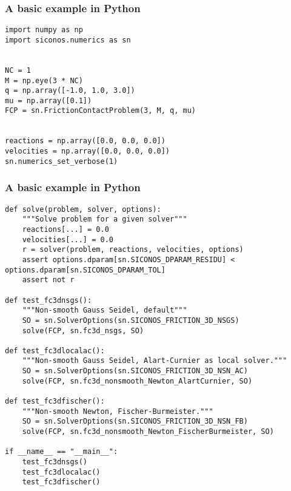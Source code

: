 \begin{frame}[fragile]
  \frametitle{A basic example in Python}
    {\small
      \begin{verbatim}
import numpy as np
import siconos.numerics as sn


NC = 1
M = np.eye(3 * NC)
q = np.array([-1.0, 1.0, 3.0])
mu = np.array([0.1])
FCP = sn.FrictionContactProblem(3, M, q, mu)


reactions = np.array([0.0, 0.0, 0.0])
velocities = np.array([0.0, 0.0, 0.0])
sn.numerics_set_verbose(1)

      \end{verbatim}
    }
  \end{frame}
\begin{frame}[fragile]
  \frametitle{A basic example in Python}
    {\small
      \begin{verbatim}
def solve(problem, solver, options):
    """Solve problem for a given solver"""
    reactions[...] = 0.0
    velocities[...] = 0.0
    r = solver(problem, reactions, velocities, options)
    assert options.dparam[sn.SICONOS_DPARAM_RESIDU] < options.dparam[sn.SICONOS_DPARAM_TOL]
    assert not r

def test_fc3dnsgs():
    """Non-smooth Gauss Seidel, default"""
    SO = sn.SolverOptions(sn.SICONOS_FRICTION_3D_NSGS)
    solve(FCP, sn.fc3d_nsgs, SO)

def test_fc3dlocalac():
    """Non-smooth Gauss Seidel, Alart-Curnier as local solver."""
    SO = sn.SolverOptions(sn.SICONOS_FRICTION_3D_NSN_AC)
    solve(FCP, sn.fc3d_nonsmooth_Newton_AlartCurnier, SO)

def test_fc3dfischer():
    """Non-smooth Newton, Fischer-Burmeister."""
    SO = sn.SolverOptions(sn.SICONOS_FRICTION_3D_NSN_FB)
    solve(FCP, sn.fc3d_nonsmooth_Newton_FischerBurmeister, SO)

if __name__ == "__main__":
    test_fc3dnsgs()
    test_fc3dlocalac()
    test_fc3dfischer()
    

      \end{verbatim}
    }
  \end{frame}







  

